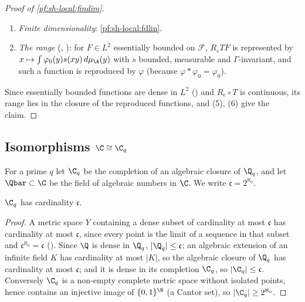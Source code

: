 \begin{proof}[Proof of \cref{pf:sh-local:findim}]
\begin{enumerate}[label=(\arabic*)]
integrable, vanishes outside a clopen set $O$ and satisfies the cusp estimate (3) for $O$, and $\Gamma$ is discrete,
then there are a continuous compactly supported $\alpha$ and finitely many $p_1,\dots,p_m\in G_\A$ such that every
bounded continuous $\Gamma$-invariant $h$ reproduced by $\varphi$, with $\int_{\mathcal F}|h|^2<\infty$ and
$\int\alpha(y)h(p_iy)\,d\mu_\A(y)=0$ for all $i$, vanishes in $L^2(\mathcal F)$.
\item \emph{Finite dimensionality}: \cref{pf:sh-local:fdlin}.
\item \emph{The range} (,
): for $F\in L^2$ essentially bounded on
$\mathcal F$, $R_eTF$ is represented by $x\mapsto\int\varphi_0(y)s(xy)\,d\mu_\A(y)$ with $s$ bounded, measurable and
$\Gamma$-invariant, and such a function is reproduced by $\varphi$ (because $\varphi*\varphi_0=\varphi_0$).
\end{enumerate}
Since essentially bounded functions are dense in $L^2$ () and
$R_e\circ T$ is continuous, its range lies in the closure of the reproduced functions, and (5), (6) give the claim.
\end{proof}

\subsection{Isomorphisms \texorpdfstring{$\C\cong\C_q$}{C = Cq}}\label{sec:pf:sh-local:cq}

For a prime $q$ let $\C_q$ be the completion of an algebraic closure of $\Q_q$, and let $\Qbar\subset\C$ be the
field of algebraic numbers in $\C$. We write $\mathfrak c=2^{\aleph_0}$.

\begin{lemma}\label{pf:sh-local:cardCq}
$\C_q$ has cardinality $\mathfrak c$.
\end{lemma}

\begin{proof}
A metric space $Y$ containing a dense subset of cardinality at most $\mathfrak c$ has cardinality at most
$\mathfrak c$, since every point is the limit of a sequence in that subset and
$\mathfrak c^{\aleph_0}=\mathfrak c$ ().
Since $\Q$ is dense in $\Q_q$, $|\Q_q|\le\mathfrak c$; an algebraic extension of an infinite field $K$ has
cardinality at most $|K|$, so the algebraic closure of $\Q_q$ has cardinality at most $\mathfrak c$; and it is dense in
its completion $\C_q$, so $|\C_q|\le\mathfrak c$. Conversely $\C_q$ is a non-empty complete metric space without
isolated points, hence contains an injective image of $\{0,1\}^{\N}$ (a Cantor set), so $|\C_q|\ge2^{\aleph_0}$.
\end{proof}

